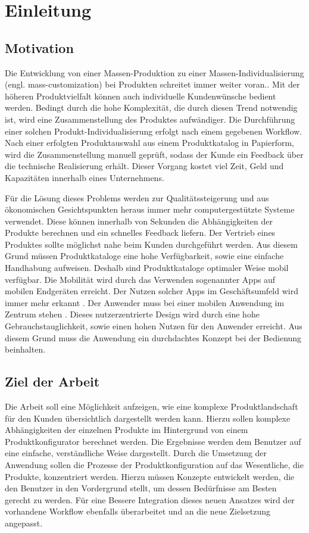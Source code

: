 \chapter{Einleitung}
\section{Motivation} \label{aufgaben}
Die Entwicklung von einer Massen-Produktion zu einer Massen-Individualisierung (engl. mass-customization) bei Produkten schreitet immer weiter voran.\cite{bib:massCustomization}. Mit der höheren Produktvielfalt können auch individuelle Kundenwünsche bedient werden. Bedingt durch die hohe Komplexität, die durch diesen Trend notwendig ist, wird eine Zusammenstellung des Produktes aufwändiger. Die Durchführung einer solchen Produkt-Individualisierung erfolgt nach einem gegebenen Workflow. Nach einer erfolgten Produktauswahl aus einem Produktkatalog in Papierform, wird die Zusammenstellung manuell geprüft, sodass der Kunde ein Feedback über die technische Realisierung erhält. Dieser Vorgang kostet viel Zeit, Geld und Kapazitäten innerhalb eines Unternehmens. \par

Für die Lösung dieses Problems werden zur Qualitätssteigerung und aus ökonomischen Gesichtspunkten heraus immer mehr computergestützte Systeme verwendet. Diese können innerhalb von Sekunden die Abhängigkeiten der Produkte berechnen und ein schnelles Feedback liefern. Der Vertrieb eines Produktes sollte möglichst nahe beim Kunden durchgeführt werden. Aus diesem Grund müssen Produktkataloge eine hohe Verfügbarkeit, sowie eine einfache Handhabung aufweisen. Deshalb sind Produktkataloge optimaler Weise mobil verfügbar. Die Mobilität wird durch das Verwenden sogenannter Apps auf mobilen Endgeräten erreicht. Der Nutzen solcher Apps im Geschäftsumfeld wird immer mehr erkannt \cite{bib:businessApps}. Der Anwender muss bei einer mobilen Anwendung im Zentrum stehen \cite{bib:businessAppsDesign}. Dieses nutzerzentrierte Design wird durch eine hohe Gebrauchstauglichkeit, sowie einen hohen Nutzen für den Anwender erreicht. Aus diesem Grund muss die Anwendung ein durchdachtes Konzept bei der Bedienung beinhalten.


\section{Ziel der Arbeit} \label{goal}
Die Arbeit soll eine Möglichkeit aufzeigen, wie eine komplexe Produktlandschaft für den Kunden übersichtlich dargestellt werden kann. Hierzu sollen komplexe Abhängigkeiten der einzelnen Produkte im Hintergrund von einem Produktkonfigurator berechnet werden. Die Ergebnisse werden dem Benutzer auf eine einfache, verständliche Weise dargestellt. Durch die Umsetzung der Anwendung sollen die Prozesse der Produktkonfiguration auf das Wesentliche, die Produkte, konzentriert werden. Hierzu müssen Konzepte entwickelt werden, die den Benutzer in den Vordergrund stellt, um dessen Bedürfnisse am Besten gerecht zu werden. Für eine Bessere Integration dieses neuen Ansatzes wird der vorhandene Workflow ebenfalls überarbeitet und an die neue Zielsetzung angepasst. 

